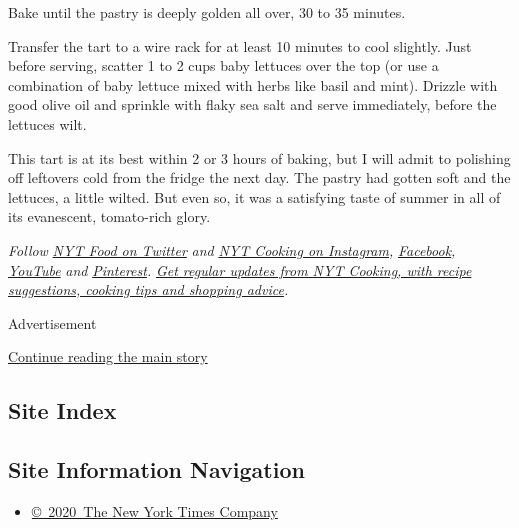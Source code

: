 Bake until the pastry is deeply golden all over, 30 to 35 minutes.

Transfer the tart to a wire rack for at least 10 minutes to cool
slightly. Just before serving, scatter 1 to 2 cups baby lettuces over
the top (or use a combination of baby lettuce mixed with herbs like
basil and mint). Drizzle with good olive oil and sprinkle with flaky sea
salt and serve immediately, before the lettuces wilt.

This tart is at its best within 2 or 3 hours of baking, but I will admit
to polishing off leftovers cold from the fridge the next day. The pastry
had gotten soft and the lettuces, a little wilted. But even so, it was a
satisfying taste of summer in all of its evanescent, tomato-rich glory.

\emph{Follow} \href{https://twitter.com/nytfood}{\emph{NYT Food on
Twitter}} \emph{and}
\href{https://www.instagram.com/nytcooking/}{\emph{NYT Cooking on
Instagram}}\emph{,}
\href{https://www.facebookcorewwwi.onion/nytcooking/}{\emph{Facebook}}\emph{,}
\href{https://www.youtube.com/nytcooking}{\emph{YouTube}} \emph{and}
\href{https://www.pinterest.com/nytcooking/}{\emph{Pinterest}}\emph{.}
\href{https://www.nytimes3xbfgragh.onion/newsletters/cooking}{\emph{Get
regular updates from NYT Cooking, with recipe suggestions, cooking tips
and shopping advice}}\emph{.}

Advertisement

\protect\hyperlink{after-bottom}{Continue reading the main story}

\hypertarget{site-index}{%
\subsection{Site Index}\label{site-index}}

\hypertarget{site-information-navigation}{%
\subsection{Site Information
Navigation}\label{site-information-navigation}}

\begin{itemize}
\tightlist
\item
  \href{https://help.nytimes3xbfgragh.onion/hc/en-us/articles/115014792127-Copyright-notice}{©~2020~The
  New York Times Company}
\end{itemize}


